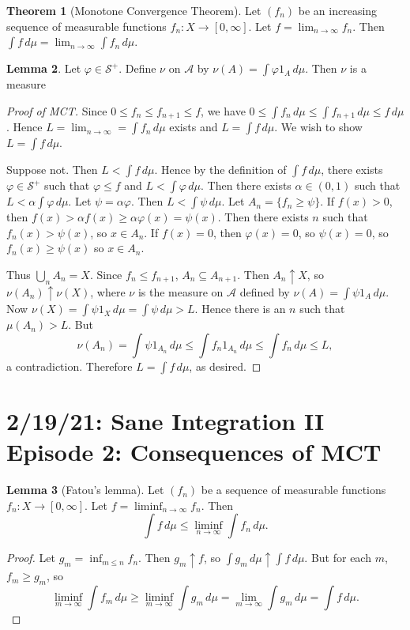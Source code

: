 \documentclass{article}
\newcommand{\oo}{{\infty}}
\theoremstyle{definition}
\newtheorem{theorem}{Theorem}
\newtheorem{lemma}[theorem]{Lemma}
\begin{document}
\begin{theorem}[Monotone Convergence Theorem]
    Let $(f_n)$ be an increasing sequence of measurable functions $f_n : X \longrightarrow [0, \infty]$. Let $f = \lim_{n\to\infty} f_n$. Then $\int f\,d\mu = \lim_{n\to\infty} \int f_n\,d\mu$.
\end{theorem}
\begin{lemma}
Let $\varphi \in \mathscr{S}^+$. Define $\nu$ on $\mathscr{A}$ by $\nu(A) = \int \varphi 1_A\,d\mu$. Then $\nu$ is a measure
\end{lemma}
\begin{proof}[Proof of MCT]
    Since $0 \leq f_n \leq f_{n+1} \leq f$, we have $0 \leq \int f_n \,d\mu \leq \int f_{n+1}\,d\mu \leq f\,d\mu$. Hence $L = \lim_{n\to\infty} = \int f_n \,d\mu$ exists and $L = \int f\,d\mu$. We wish to show $L = \int f\,d\mu$.
    
    Suppose not. Then $L < \int f\,d\mu$. Hence by the definition of $\int f\,d\mu$, there exists $\varphi \in \mathscr{S}^+$ such that $\varphi \leq f$ and $L < \int \varphi \,d\mu$. Then there exists $\alpha \in (0,1)$ such that $L < \alpha \int \varphi \,d\mu$. Let $\psi = \alpha\varphi$. Then $L < \int \psi \,d\mu$. Let $A_n = \{f_n \geq \psi\}$. If $f(x) > 0$, then $f(x) > \alpha f(x) \geq \alpha\varphi(x) = \psi(x)$. Then there exists $n$ such that $f_n(x) > \psi(x)$, so $x \in A_n$. If $f(x) = 0$, then $\varphi(x) = 0$, so $\psi(x) = 0$, so $f_n(x) \geq \psi(x)$ so $x \in A_n$.
    
    Thus $\bigcup_n A_n = X$. Since $f_n \leq f_{n+1}$, $A_n \subseteq A_{n+1}$. Then $A_n \uparrow X$, so $\nu(A_n) \uparrow \nu(X)$, where $\nu$ is the measure on $\mathscr{A}$ defined by $\nu(A) = \int \psi 1_A \,d\mu$. Now $\nu(X) = \int \psi 1_X \,d\mu = \int \psi \,d\mu > L$. Hence there is an $n$ such that $\mu(A_n) > L$. But
    \[
        \nu(A_n) = \int \psi 1_{A_n} \,d\mu \leq \int f_n 1_{A_n} \,d\mu \leq \int f_n \,d\mu \leq L,
    \]
    a contradiction. Therefore $L = \int f \,d\mu$, as desired.
\end{proof}

\section*{2/19/21: Sane Integration II Episode 2: Consequences of MCT}

\begin{lemma}[Fatou's lemma]
    Let $(f_n)$ be a sequence of measurable functions $f_n : X \longrightarrow [0, \infty]$.
    Let $f = \liminf_{n\to\infty} f_n$. Then
    \[
        \int f\,d\mu \leq \liminf_{n\to\infty} \int f_n\,d\mu.
    \]
\end{lemma}
\begin{proof}
    Let $g_m = \inf_{m \leq n} f_n$. Then $g_m \uparrow f$, so $\int g_m\,d\mu \uparrow \int f\,d\mu$.
    But for each $m$, $f_m \geq g_m$, so
    \[
        \liminf_{m\to\oo}\int f_m\,d\mu \geq \liminf_{m\to\oo}\int g_m\,d\mu = \lim_{m\to\infty} \int g_m\,d\mu = \int f\,d\mu.
    \]
\end{proof}
\end{document}
